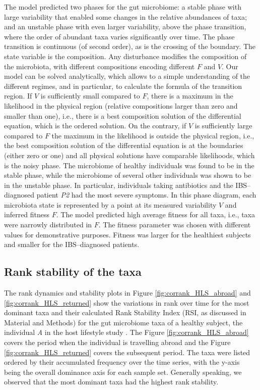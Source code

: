 The model predicted two phases for the gut microbiome: a stable phase with large variability that enabled some changes in the relative abundances of taxa; and an unstable phase with even larger variability, above the phase transition, where the order of abundant taxa varies significantly over time. The phase transition is continuous (of second order), as is the crossing of the boundary. The state variable is the composition. Any disturbance modifies the composition of the microbiota, with different compositions encoding different $F$ and $V$. Our model can be solved analytically, which allows to a simple understanding of the different regimes, and in particular, to calculate the formula of the transition region. If $V$ is sufficiently small compared to $F$, there is a maximum in the likelihood in the physical region (relative compositions larger than zero and smaller than one), i.e., there is a best composition solution of the differential equation, which is the ordered solution. On the contrary, if $V$ is sufficiently large compared to $F$ the maximum in the likelihood is outside the physical region, i.e., the best composition solution of the differential equation is at the boundaries (either zero or one) and all physical solutions have comparable likelihoods, which is the noisy phase. The microbiome of healthy individuals was found to be in the stable phase, while the microbiome of several other individuals was shown to be in the unstable phase. In particular, individuals taking antibiotics and the IBS--diagnosed patient \emph{P2} had the most severe symptoms. In this phase diagram, each microbiota state is represented by a point at its measured variability $V$ and inferred fitness $F$. The model predicted high average fitness for all taxa, i.e., taxa were narrowly distributed in $F$. The fitness parameter was chosen with different values for demonstrative purposes. Fitness was larger for the healthiest subjects and smaller for the IBS--diagnosed patients.

\subsection*{Rank stability of the taxa} 

The rank dynamics and stability plots in Figure \ref{fig:corrank_HLS_abroad} and \ref{fig:corrank_HLS_returned} show the variations in rank over time for the most dominant taxa and their calculated Rank Stability Index (RSI, as discussed in Material and Methods) for the gut microbiome taxa of a healthy subject, the individual \emph{A} in the host lifestyle study \cite{hostlife}. The Figure \ref{fig:corrank_HLS_abroad} covers the period when the individual is travelling abroad and the Figure \ref{fig:corrank_HLS_returned} covers the subsequent period. The taxa were listed ordered by their accumulated frequency over the time series, with the y-axis being the overall dominance axis for each sample set. Generally speaking, we observed that the most dominant taxa had the highest rank stability. 

